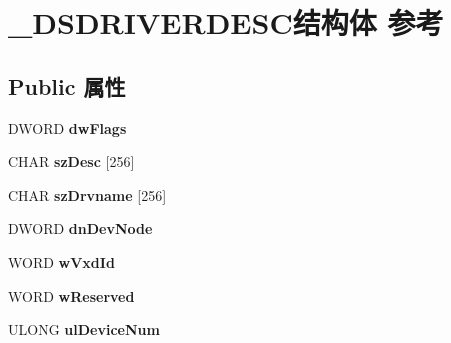 \hypertarget{struct___d_s_d_r_i_v_e_r_d_e_s_c}{}\section{\+\_\+\+D\+S\+D\+R\+I\+V\+E\+R\+D\+E\+S\+C结构体 参考}
\label{struct___d_s_d_r_i_v_e_r_d_e_s_c}
\subsection*{Public 属性}
\begin{DoxyCompactItemize}
\item 
\mbox{\label{struct___d_s_d_r_i_v_e_r_d_e_s_c_a519e981c4d9ab4d4df986f57a69d3aee}} 
D\+W\+O\+RD {\bfseries dw\+Flags}
\item 
\mbox{\label{struct___d_s_d_r_i_v_e_r_d_e_s_c_ab681ac380e87e86a0b04e6ca5a8c70c8}} 
C\+H\+AR {\bfseries sz\+Desc} \mbox{[}256\mbox{]}
\item 
\mbox{\label{struct___d_s_d_r_i_v_e_r_d_e_s_c_a7339ca5e634c87987bab2d1819567e60}} 
C\+H\+AR {\bfseries sz\+Drvname} \mbox{[}256\mbox{]}
\item 
\mbox{\label{struct___d_s_d_r_i_v_e_r_d_e_s_c_a1ca83d56d621cf7c91b38d0e55a61791}} 
D\+W\+O\+RD {\bfseries dn\+Dev\+Node}
\item 
\mbox{\label{struct___d_s_d_r_i_v_e_r_d_e_s_c_a6e270818105a629f6fe2cb5ef4da7cc5}} 
W\+O\+RD {\bfseries w\+Vxd\+Id}
\item 
\mbox{\label{struct___d_s_d_r_i_v_e_r_d_e_s_c_aba316edc1347a38755b8ac940bdccef9}} 
W\+O\+RD {\bfseries w\+Reserved}
\item 
\mbox{\label{struct___d_s_d_r_i_v_e_r_d_e_s_c_a79df882782332c728b3e1d022a64fcb1}} 
U\+L\+O\+NG {\bfseries ul\+Device\+Num}
\item 
\mbox{\label{struct___d_s_d_r_i_v_e_r_d_e_s_c_ae500cd416d68bc92a92135223896a702}} 

\end{DoxyCompactItemize}
